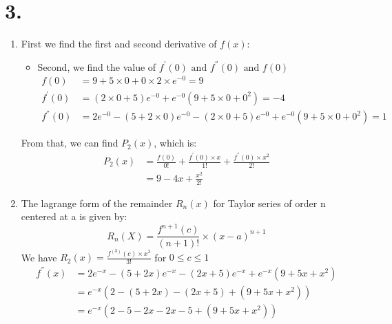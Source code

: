 \documentclass{article}
\begin{document}
    \section*{3. }
    \begin{enumerate}[label=({\alph*})]
        \item First we find the first and second derivative of \(f(x)\):
        \begin{itemize}
            \begin{align*}
                f^{'}(x) &= (2x + 5)e^{-x} - e^{-x}(9 + 5x + x^2) \\
                f^{''}(x) &= 2e^{-x} - (5 + 2x)e^{-x} - (2x + 5)e^{-x} + e^{-x}(9 + 5x + x^2) \\
            \end{align*}
            \item Second, we find the value of \(f^{'}(0) \text{ and } f^{''}(0) \text{ and } f(0)\)
            \begin{align}
                f(0) &= 9 + 5 \times 0 + 0 \times 2 \times e^{-0} = 9 \\
                f^{'}(0) &= (2 \times 0 + 5)e^{-0} + e^{-0}(9 + 5 \times 0 + 0^2) = -4 \\
                f^{''}(0) &=  2e^{-0} - (5 + 2 \times 0)e^{-0} - (2 \times 0 + 5)e^{-0} + e^{-0}(9 + 5 \times 0 + 0^2) = 1
            \end{align}
        \end{itemize}
        From that, we can find \(P_{2}(x)\), which is:
        \begin{align}
            P_{2}(x) &= \frac{f(0)}{0!} + \frac{f^{'}(0) \times x}{1!} + \frac{f^{''}(0) \times x^2}{2!} \\
                    &= 9 - 4x + \frac{x^{2}}{2!}
        \end{align}
        \item The lagrange form of the remainder \(R_{n}(x)\) for Taylor series of order n centered at a is given by:
        \[R_{n}(X) = \frac{f^{n + 1}(c)}{(n + 1)!} \times (x - a)^{n + 1}\]
        We have \(R_{2}(x) = \frac{f^{(3)}(c) \times x^3}{3!}\) for \(0 \leq c \leq 1\)
        \begin{align}
            f^{''}(x) &= 2e^{-x} - (5 + 2x)e^{-x} - (2x + 5)e^{-x} + e^{-x}(9 + 5x + x^2) \\
                      &= e^{-x}\left(2 - (5 + 2x) - (2x + 5) + (9 + 5x + x^2) \right) \\
                      &= e^{-x}\left(2 - 5 - 2x - 2x - 5 + (9 + 5x + x^2) \right) \\

\end{align}
\end{enumerate}
\end{document}
